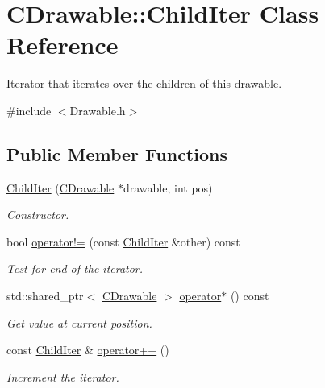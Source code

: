 \hypertarget{class_c_drawable_1_1_child_iter}{\section{C\+Drawable\+:\+:Child\+Iter Class Reference}
\label{class_c_drawable_1_1_child_iter}
}


Iterator that iterates over the children of this drawable.  




{\ttfamily \#include $<$Drawable.\+h$>$}

\subsection*{Public Member Functions}
\begin{DoxyCompactItemize}
\item 
\hyperlink{class_c_drawable_1_1_child_iter_aff2b166d86e322969bb14d031c836245}{Child\+Iter} (\hyperlink{class_c_drawable}{C\+Drawable} $\ast$drawable, int pos)
\begin{DoxyCompactList}\small\item\em Constructor. \end{DoxyCompactList}\item 
bool \hyperlink{class_c_drawable_1_1_child_iter_a3f803c70911990c08c35e73b2572cc09}{operator!=} (const \hyperlink{class_c_drawable_1_1_child_iter}{Child\+Iter} \&other) const 
\begin{DoxyCompactList}\small\item\em Test for end of the iterator. \end{DoxyCompactList}\item 
std\+::shared\+\_\+ptr$<$ \hyperlink{class_c_drawable}{C\+Drawable} $>$ \hyperlink{class_c_drawable_1_1_child_iter_af7785aca65c748b70114095dee19ea79}{operator$\ast$} () const 
\begin{DoxyCompactList}\small\item\em Get value at current position. \end{DoxyCompactList}\item 
const \hyperlink{class_c_drawable_1_1_child_iter}{Child\+Iter} \& \hyperlink{class_c_drawable_1_1_child_iter_a57a843f770364ca146899f64b24c6999}{operator++} ()
\begin{DoxyCompactList}\small\item\em Increment the iterator. \end{DoxyCompactList}\end{DoxyCompactItemize}


